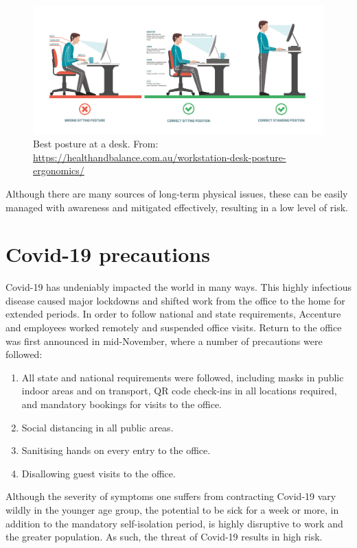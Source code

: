 \begin{figure}[H]
  \centering
  \includegraphics[width=\textwidth]{posture_desk.jpeg}
  \caption[Best posture at a desk.]{Best posture at a desk. From: \url{https://healthandbalance.com.au/workstation-desk-posture-ergonomics/}}
  \label{fig:posture_desk}
\end{figure}

Although there are many sources of long-term physical issues, these can be easily managed with awareness and mitigated effectively, resulting in a low level of risk. 

\section{Covid-19 precautions}
Covid-19 has undeniably impacted the world in many ways. This highly infectious disease caused major lockdowns and shifted work from the office to the home for extended periods. In order to follow national and state requirements, Accenture and employees worked remotely and suspended office visits. Return to the office was first announced in mid-November, where a number of precautions were followed:

\begin{enumerate}
  \item All state and national requirements were followed, including masks in public indoor areas and on transport, QR code check-ins in all locations required, and mandatory bookings for visits to the office.
  \item Social distancing in all public areas. 
  \item Sanitising hands on every entry to the office.
  \item Disallowing guest visits to the office. 
\end{enumerate}

Although the severity of symptoms one suffers from contracting Covid-19 vary wildly in the younger age group, the potential to be sick for a week or more, in addition to the mandatory self-isolation period, is highly disruptive to work and the greater population. As such, the threat of Covid-19 results in high risk. 


